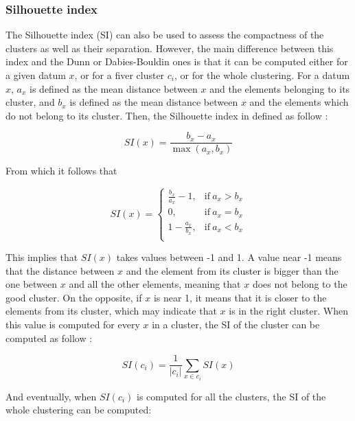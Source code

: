 \documentclass[a4paper]{report}
\begin{document}
    \subsubsection{Silhouette index}
    The Silhouette index (SI) can also be used to assess the compactness of the clusters as well as their separation. However, the main difference between this index and the Dunn or Dabies-Bouldin ones is that it can be computed either for a given datum $x$, or for a fiver cluster $c_i$, or for the whole clustering. For a datum $x$, $a_x$ is defined as the mean distance between $x$ and the elements belonging to its cluster, and $b_x$ is defined as the mean distance between $x$ and the elements which do not belong to its cluster. Then, the Silhouette index in defined as follow :

    \begin{equation}
        SI(x) = \frac{b_x - a_x}{\max(a_x, b_x)}
        \label{eq:si_x}
    \end{equation}

    From which it follows that 

    \begin{equation}
        SI(x) = 
        \begin{cases}
            \frac{b_x}{a_x} - 1, & \text{if}\ a_x > b_x \\
            0, & \text{if}\ a_x = b_x \\
            1 - \frac{a_x}{b_x}, & \text{if}\ a_x < b_x \\
        \end{cases}
        \label{eq:si_x_detail}
    \end{equation}

    This implies that $SI(x)$ takes values between -1 and 1. A value near -1 means that the distance between $x$ and the element from its cluster is bigger than the one between $x$ and all the other elements, meaning that $x$ does not belong to the good cluster. On the opposite, if $x$ is near 1, it means that it is closer to the elements from its cluster, which may indicate that $x$ is in the right cluster. When this value is computed for every $x$ in a cluster, the SI of the cluster can be computed as follow :

    \begin{equation}
        SI(c_i) = \frac{1}{|c_i|}\sum_{x \in c_i} SI(x)
        \label{eq:si_ci}
    \end{equation}

    And eventually, when $SI(c_i)$ is computed for all the clusters, the SI of the whole clustering can be computed:
\end{document}
